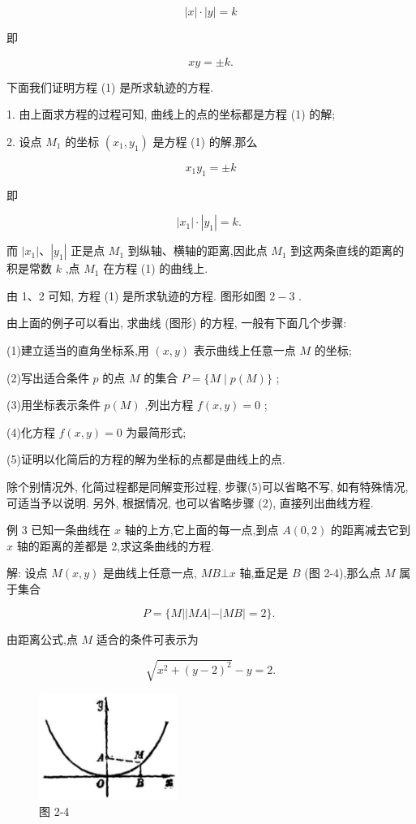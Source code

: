 \documentclass[lang=cn,newtx,10pt,scheme=chinese]{elegantbook}
\begin{document}
\[
  \left| x\right| \cdot \left| y\right| = k
\]

即

\[
    {xy} = \pm k\text{.} \tag{1}
\]

下面我们证明方程 (1) 是所求轨迹的方程.

1. 由上面求方程的过程可知, 曲线上的点的坐标都是方程 (1) 的解;

2. 设点 \({M}_{1}\) 的坐标 \(\left( {{x}_{1},{y}_{1}}\right)\) 是方程 (1) 的解,那么

\[
    {x}_{1}{y}_{1} = \pm k
\]

即

\[
  \left| {x}_{1}\right| \cdot \left| {y}_{1}\right| = k\text{. }
\]

而 \(\left| {x}_{1}\right| \text{、}\left| {y}_{1}\right|\) 正是点 \({M}_{1}\) 到纵轴、横轴的距离,因此点 \({M}_{1}\) 到这两条直线的距离的积是常数 \(k\) ,点 \({M}_{1}\) 在方程 (1) 的曲线上.

由 1、2 可知, 方程 (1) 是所求轨迹的方程. 图形如图 \(2 - 3\) .

由上面的例子可以看出, 求曲线 (图形) 的方程, 一般有下面几个步骤:

(1)建立适当的直角坐标系,用 \(\left( {x,y}\right)\) 表示曲线上任意一点 \(M\) 的坐标;

(2)写出适合条件 \(p\) 的点 \(M\) 的集合 \(P = \{ M \mid p\left( M\right) \}\) ;

(3)用坐标表示条件 \(p\left( M\right)\) ,列出方程 \(f\left( {x,y}\right) = 0\) ;

(4)化方程 \(f\left( {x,y}\right) = 0\) 为最简形式;

(5)证明以化简后的方程的解为坐标的点都是曲线上的点.

除个别情况外, 化简过程都是同解变形过程, 步骤(5)可以省略不写, 如有特殊情况, 可适当予以说明. 另外, 根据情况, 也可以省略步骤 (2), 直接列出曲线方程.

例 3 已知一条曲线在 \(x\) 轴的上方,它上面的每一点,到点 \(A\left( {0,2}\right)\) 的距离减去它到 \(x\) 轴的距离的差都是 2,求这条曲线的方程.

解: 设点 \(M\left( {x,y}\right)\) 是曲线上任意一点, \({MB} \bot x\) 轴,垂足是 \(B\) (图 2-4),那么点 \(M\) 属于集合

\[
  P = \{ M\left| \right| {MA}\left| -\right| {MB} \mid = 2\} \text{. }
\]

由距离公式,点 \(M\) 适合的条件可表示为

\[
  \sqrt{{x}^{2} + {\left( y - 2\right) }^{2}} - y = 2. \tag{1}
\]

\begin{figure}[h]
  \centering
  \includegraphics[max width=0.4\textwidth]{images/01912cc2-ffb6-728e-9ae7-b113ff05c64b_70_664169.jpg}
  \caption{图 2-4}
\end{figure}
\end{document}
